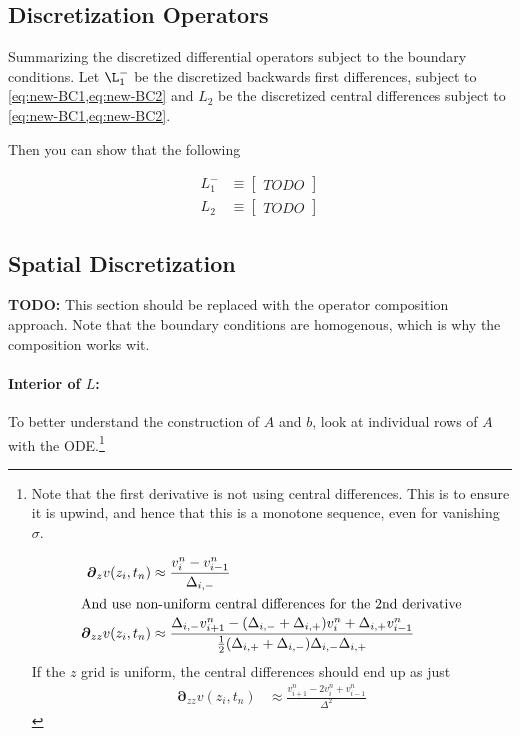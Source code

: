 \documentclass[11pt]{article}
\newcommand{\D}[1][]{\ensuremath{\boldsymbol{\partial}_{#1}}}
\begin{document}
\subsection{Discretization Operators}\label{sec:discretization-operators}
Summarizing the discretized differential operators subject to the boundary conditions.  Let $\L_1^{-}$ be the discretized backwards first differences, subject to \cref{eq:new-BC1,eq:new-BC2} and $L_2$ be the discretized central differences subject to \cref{eq:new-BC1,eq:new-BC2}.

Then you can show that the following  

\begin{align}
L_1^{-} &\equiv \begin{bmatrix} TODO \end{bmatrix}\\
	L_2 &\equiv \begin{bmatrix}  TODO \end{bmatrix}
\end{align}

\subsection{Spatial Discretization}\label{sec:spatial-discretization}


\textbf{TODO:} This section should be replaced with the operator composition approach.  Note that the boundary conditions are homogenous, which is why the composition works wit.

\paragraph{Interior of $L$:}
To better understand the construction of $A$ and $b$, look at individual rows of $A$ with the ODE.\footnote{Note that the first derivative is not using central differences.  This is to ensure it is upwind, and hence that this is a monotone sequence, even for vanishing $\sigma$.

\begin{align}
\D[z]v(z_i, t_n) &\approx \frac{v_i^n - v_{i-1}^n}{\Delta_{i,-}}\label{eq:D-v-z}\\
\intertext{And use non-uniform central differences for the 2nd derivative}
\D[zz]v(z_i, t_n) &\approx \frac{\Delta_{i,-}v^n_{i+1} - (\Delta_{i,-}+\Delta_{i,+})v^n_i+\Delta_{i,+}v^n_{i-1}}{\frac1{2}(\Delta_{i,+}+\Delta_{i,-})\Delta_{i,-}\Delta_{i,+}}\label{eq:D-v-zz}
\end{align}
If the $z$ grid is uniform, the central differences should end up as just
\begin{align}
	\D[zz]v(z_i, t_n) &\approx \frac{v_{i+1}^n - 2 v_i^n + v_{i-1}^n}{\Delta^2}\label{eq:D-v-zz}
\end{align}
}
\end{document}
